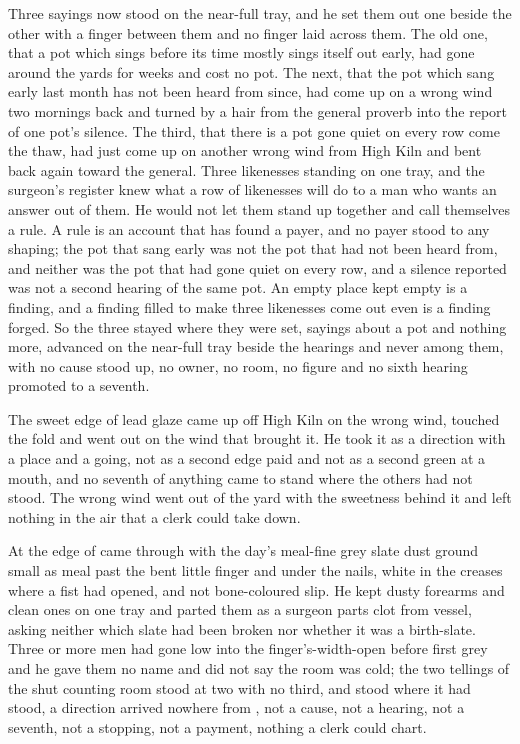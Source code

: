 Three sayings now stood on the near-full tray, and he set them out one beside the other with a finger between them and no finger laid across them. The old one, that a pot which sings before its time mostly sings itself out early, had gone around the yards for weeks and cost no pot. The next, that the pot which sang early last month has not been heard from since, had come up on a wrong wind two mornings back and turned by a hair from the general proverb into the report of one pot's silence. The third, that there is a pot gone quiet on every row come the thaw, had just come up on another wrong wind from High Kiln and bent back again toward the general. Three likenesses standing on one tray, and the surgeon's register knew what a row of likenesses will do to a man who wants an answer out of them. He would not let them stand up together and call themselves a rule. A rule is an account that has found a payer, and no payer stood to any shaping; the pot that sang early was not the pot that had not been heard from, and neither was the pot that had gone quiet on every row, and a silence reported was not a second hearing of the same pot. An empty place kept empty is a finding, and a finding filled to make three likenesses come out even is a finding forged. So the three stayed where they were set, sayings about a pot and nothing more, advanced on the near-full tray beside the hearings and never among them, with no cause stood up, no owner, no room, no figure and no sixth hearing promoted to a seventh.

The sweet edge of lead glaze came up off High Kiln on the wrong wind, touched the fold and went out on the wind that brought it. He took it as a direction with a place and a going, not as a second edge paid and not as a second green at a mouth, and no seventh of anything came to stand where the others had not stood. The wrong wind went out of the yard with the sweetness behind it and left nothing in the air that a clerk could take down.

At the edge of   came through with the day's meal-fine grey slate dust ground small as meal past the bent little finger and under the nails, white in the creases where a fist had opened, and not bone-coloured slip. He kept dusty forearms and clean ones on one tray and parted them as a surgeon parts clot from vessel, asking neither which slate had been broken nor whether it was a birth-slate. Three or more men had gone low into the finger's-width-open  before first grey and he gave them no name and did not say the room was cold; the two tellings of the shut counting room stood at two with no third, and  stood where it had stood, a direction arrived nowhere from , not a cause, not a hearing, not a seventh, not a stopping, not a payment, nothing a clerk could chart.

